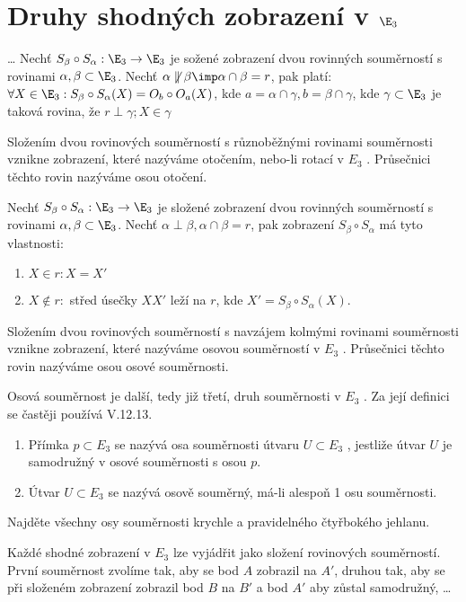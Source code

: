 
\let\braceru=\relax \let\bracelu=\relax 
\def\o#1{\setbox0=
	\hbox{$\kern2pt\overbrace{\kern-2pt#1\kern-2pt}\kern2pt$}\ht0=2.1ex\box0}
\def\to#1{\hbox{#1\rlap{\t{}}}}
\def\rad{\rm{rad}}
\def\f{\frac}
\section{Druhy shodných  zobrazení v $\E_3$}
{\Huge\dots}
\V Nechť $S_\beta \circ S_\alpha : \E_3 \rightarrow \E_3$ je
sožené zobrazení dvou rovinných souměrností s rovinami $\alpha,\beta \subset \E_3$. Nechť $\alpha \not\parallel \beta \imp \alpha\cap\beta = r$, pak platí:
$\forall X \in \E_3 : S_\beta \circ S_\alpha (X) = O_b\circ O_a (X)$, kde 
$a=\alpha \cap \gamma,b=\beta\cap\gamma$, kde $\gamma\subset\E_3$ je taková rovina, že $r\perp \gamma;X\in\gamma$


\Def Složením dvou rovinových souměrností s různoběžnými rovinami souměrnosti vznikne
zobrazení, které nazýváme otočením, nebo-li rotací v $E_3$ . Průsečnici těchto rovin
nazýváme osou otočení.

\V Nechť $S_\beta \circ S_\alpha : \E_3 \rightarrow \E_3$ je
složené zobrazení dvou rovinných souměrností s rovinami $\alpha,\beta \subset \E_3$.
Nechť $\alpha \perp \beta , \alpha \cap \beta  = r$, pak zobrazení $S_\beta \circ S_\alpha$ má tyto vlastnosti:
\begin{enumerate}
	\item $X\in r : X=X'$
	\item $X\not\in r :$ střed úsečky $XX'$ leží na $r$, kde $X' = S_\beta \circ S_\alpha (X)$.
\end{enumerate}

\Def
Složením dvou rovinových souměrností s navzájem kolmými rovinami souměrnosti
vznikne zobrazení, které nazýváme osovou souměrností v $E_3$ . Průsečnici těchto rovin
nazýváme osou osové souměrnosti.

\Poz Osová souměrnost je další, tedy již třetí, druh souměrnosti v $E_3$ . Za její definici se častěji
používá V.12.13.

\begin{enumerate}
	\item
\Def
		Přímka $p \subset E_3$ se nazývá osa souměrnosti útvaru $U \subset E_3$ , jestliže útvar $U$ je
		samodružný v osové souměrnosti s osou $p$.
	\item Útvar $U \subset E_3$ se nazývá osově souměrný, má-li alespoň 1 osu souměrnosti.
\end{enumerate}
\Pr Najděte všechny osy souměrnosti krychle a pravidelného čtyřbokého jehlanu.

\Poz Každé shodné zobrazení v $E_3$ lze vyjádřit jako složení rovinových souměrností. První
souměrnost zvolíme tak, aby se bod $A$ zobrazil na $A'$, druhou tak, aby se při složeném
zobrazení zobrazil bod $B$ na $B'$ a  bod $A'$ aby zůstal samodružný,
 \dots



\EndDoc


